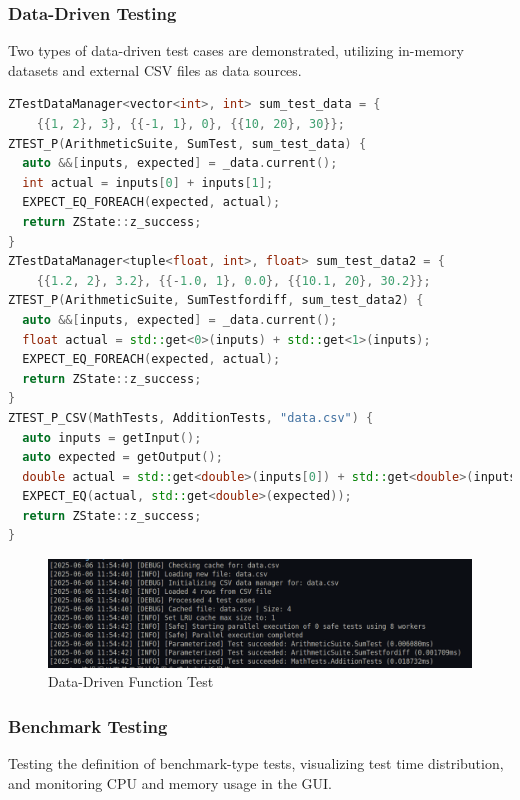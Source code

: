 \documentclass{article}
\begin{document}
\subsubsection{Data-Driven Testing}
Two types of data-driven test cases are demonstrated, utilizing in-memory datasets and external CSV files as data sources.

\begin{framed}
    \begin{lstlisting}[language=C++]
ZTestDataManager<vector<int>, int> sum_test_data = {
    {{1, 2}, 3}, {{-1, 1}, 0}, {{10, 20}, 30}};
ZTEST_P(ArithmeticSuite, SumTest, sum_test_data) {
  auto &&[inputs, expected] = _data.current();
  int actual = inputs[0] + inputs[1];
  EXPECT_EQ_FOREACH(expected, actual);
  return ZState::z_success;
}
ZTestDataManager<tuple<float, int>, float> sum_test_data2 = {
    {{1.2, 2}, 3.2}, {{-1.0, 1}, 0.0}, {{10.1, 20}, 30.2}};
ZTEST_P(ArithmeticSuite, SumTestfordiff, sum_test_data2) {
  auto &&[inputs, expected] = _data.current();
  float actual = std::get<0>(inputs) + std::get<1>(inputs);
  EXPECT_EQ_FOREACH(expected, actual);
  return ZState::z_success;
}
ZTEST_P_CSV(MathTests, AdditionTests, "data.csv") {
  auto inputs = getInput();
  auto expected = getOutput();
  double actual = std::get<double>(inputs[0]) + std::get<double>(inputs[1]);
  EXPECT_EQ(actual, std::get<double>(expected));
  return ZState::z_success;
}
\end{lstlisting}
\end{framed}
\begin{figure}[H]
    \centering
    \includegraphics[width=\textwidth]{img/data.png}
    \caption{Data-Driven Function Test}
    \label{fig: Data-Driven Function Test}
\end{figure}
\subsubsection{Benchmark Testing}
Testing the definition of benchmark-type tests, visualizing test time distribution, and monitoring CPU and memory usage in the GUI.
\end{document}
